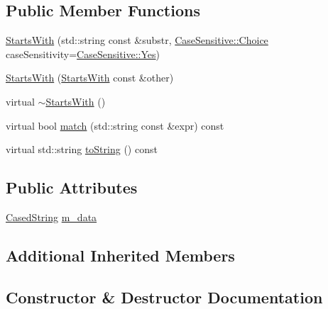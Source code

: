 \subsection*{Public Member Functions}
\begin{DoxyCompactItemize}
\item 
\hyperlink{struct_catch_1_1_matchers_1_1_impl_1_1_std_string_1_1_starts_with_a0db1bd8876219464ae60346c9525bcf6}{Starts\+With} (std\+::string const \&substr, \hyperlink{struct_catch_1_1_case_sensitive_aad49d3aee2d97066642fffa919685c6a}{Case\+Sensitive\+::\+Choice} case\+Sensitivity=\hyperlink{struct_catch_1_1_case_sensitive_aad49d3aee2d97066642fffa919685c6aa7c5550b69ec3c502e6f609b67f9613c6}{Case\+Sensitive\+::\+Yes})
\item 
\hyperlink{struct_catch_1_1_matchers_1_1_impl_1_1_std_string_1_1_starts_with_a5526cb587632e7e46253d6f60ae01098}{Starts\+With} (\hyperlink{struct_catch_1_1_matchers_1_1_impl_1_1_std_string_1_1_starts_with}{Starts\+With} const \&other)
\item 
virtual \hyperlink{struct_catch_1_1_matchers_1_1_impl_1_1_std_string_1_1_starts_with_ad22a0d01b6c29bd4784ffff988e99992}{$\sim$\+Starts\+With} ()
\item 
virtual bool \hyperlink{struct_catch_1_1_matchers_1_1_impl_1_1_std_string_1_1_starts_with_ab8f8d15e06d7ec13fee7d9ec4075dafa}{match} (std\+::string const \&expr) const
\item 
virtual std\+::string \hyperlink{struct_catch_1_1_matchers_1_1_impl_1_1_std_string_1_1_starts_with_a85a24e2ac23025edbe31cbf5bb755fb3}{to\+String} () const
\end{DoxyCompactItemize}
\subsection*{Public Attributes}
\begin{DoxyCompactItemize}
\item 
\hyperlink{struct_catch_1_1_matchers_1_1_impl_1_1_std_string_1_1_cased_string}{Cased\+String} \hyperlink{struct_catch_1_1_matchers_1_1_impl_1_1_std_string_1_1_starts_with_accaace83106244c635d251addb028125}{m\+\_\+data}
\end{DoxyCompactItemize}
\subsection*{Additional Inherited Members}


\subsection{Constructor \& Destructor Documentation}
\hypertarget{struct_catch_1_1_matchers_1_1_impl_1_1_std_string_1_1_starts_with_a0db1bd8876219464ae60346c9525bcf6}{}\label{struct_catch_1_1_matchers_1_1_impl_1_1_std_string_1_1_starts_with_a0db1bd8876219464ae60346c9525bcf6} 
